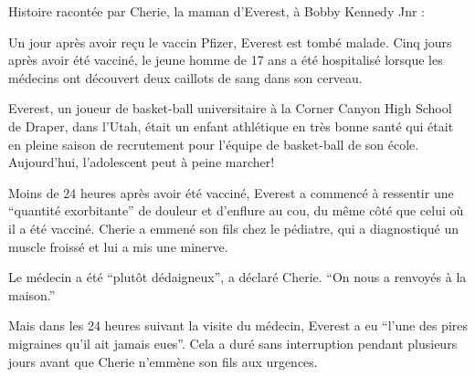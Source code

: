 Histoire racontée par Cherie, la maman d'Everest, à Bobby Kennedy Jnr :

Un jour après avoir reçu le vaccin Pfizer, Everest est tombé malade. Cinq jours
après avoir été vacciné, le jeune homme de 17 ans a été hospitalisé lorsque les
médecins ont découvert deux caillots de sang dans son cerveau.

Everest, un joueur de basket-ball universitaire à la Corner Canyon High School
de Draper, dans l'Utah, était un enfant athlétique en très bonne santé qui était
en pleine saison de recrutement pour l'équipe de basket-ball de son
école. Aujourd'hui, l'adolescent peut à peine marcher!

Moins de 24 heures après avoir été vacciné, Everest a commencé à ressentir une
“quantité exorbitante” de douleur et d'enflure au cou, du même côté que celui où
il a été vacciné. Cherie a emmené son fils chez le pédiatre, qui a diagnostiqué
un muscle froissé et lui a mis une minerve.

Le médecin a été “plutôt dédaigneux”, a déclaré Cherie. “On nous a renvoyés à la
maison.”

Mais dans les 24 heures suivant la visite du médecin, Everest a eu “l'une des
pires migraines qu'il ait jamais eues”. Cela a duré sans interruption pendant
plusieurs jours avant que Cherie n'emmène son fils aux urgences.

